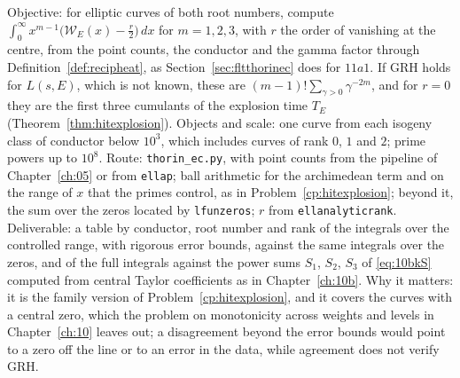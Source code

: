 \begin{compproblem}\label{cp:fltheat}
Objective: for elliptic curves of both root numbers, compute $\int_0^\infty x^{m-1}\bigl(\mathcal W_E(x)-\frac r2\bigr)\,dx$ for $m=1,2,3$, with $r$ the order of vanishing at the centre, from the point counts, the conductor and the gamma factor through Definition~\ref{def:recipheat}, as Section~\ref{sec:fltthorinec} does for $11a1$. If GRH holds for $L(s,E)$, which is not known, these are $(m-1)!\sum_{\gamma>0}\gamma^{-2m}$, and for $r=0$ they are the first three cumulants of the explosion time $T_E$ (Theorem~\ref{thm:hitexplosion}). Objects and scale: one curve from each isogeny class of conductor below $10^3$, which includes curves of rank $0$, $1$ and $2$; prime powers up to $10^8$. Route: \texttt{thorin\_ec.py}, with point counts from the pipeline of Chapter~\ref{ch:05} or from \texttt{ellap}; ball arithmetic for the archimedean term and on the range of $x$ that the primes control, as in Problem~\ref{cp:hitexplosion}; beyond it, the sum over the zeros located by \texttt{lfunzeros}; $r$ from \texttt{ellanalyticrank}. Deliverable: a table by conductor, root number and rank of the integrals over the controlled range, with rigorous error bounds, against the same integrals over the zeros, and of the full integrals against the power sums $S_1$, $S_2$, $S_3$ of \eqref{eq:10bkS} computed from central Taylor coefficients as in Chapter~\ref{ch:10b}. Why it matters: it is the family version of Problem~\ref{cp:hitexplosion}, and it covers the curves with a central zero, which the problem on monotonicity across weights and levels in Chapter~\ref{ch:10} leaves out; a disagreement beyond the error bounds would point to a zero off the line or to an error in the data, while agreement does not verify GRH.
\end{compproblem}

